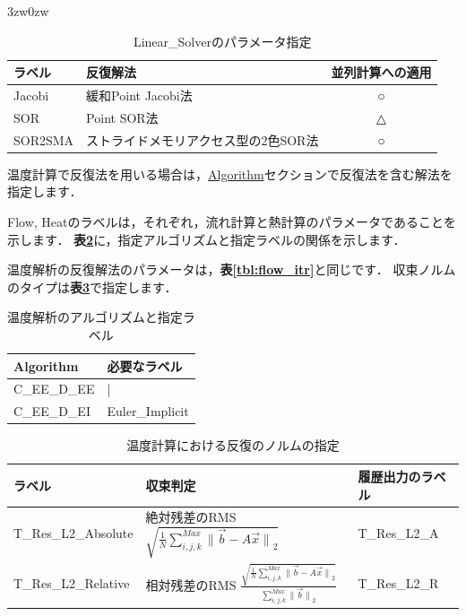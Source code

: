 \begin{indentation}{3zw}{0zw}
\begin{table}[htdp]
\caption{Linear\_Solverのパラメータ指定}
\begin{center}
\small
\begin{tabular}{llc} \toprule
ラベル & 反復解法 & 並列計算への適用\\ \midrule
Jacobi & 緩和Point Jacobi法 & ○\\
SOR & Point SOR法 & △\\
SOR2SMA & ストライドメモリアクセス型の2色SOR法 & ○\\ \bottomrule
\end{tabular}
\end{center}
\label{tbl:LS}
\end{table}


温度計算で反復法を用いる場合は，\hyperlink{tgt:algorithm}{Algorithm}セクションで反復法を含む解法を指定します．

Flow, Heatのラベルは，それぞれ，流れ計算と熱計算のパラメータであることを示します．
\textbf{表\ref{tbl:itr_temp_algo}}に，指定アルゴリズムと指定ラベルの関係を示します．

温度解析の反復解法のパラメータは，\textbf{表\ref{tbl:flow_itr}}と同じです．
収束ノルムのタイプは\textbf{表\ref{tbl:norm-type4temp}}で指定します．

\begin{table}[htdp]
\caption{温度解析のアルゴリズムと指定ラベル}
\begin{center}
\small
\begin{tabular}{ll} \toprule
Algorithm &  必要なラベル\\ \midrule
C\_EE\_D\_EE & | \\
C\_EE\_D\_EI & Euler\_Implicit\\ \bottomrule
\end{tabular}
\end{center}
\label{tbl:itr_temp_algo}
\end{table}

\begin{table}[htdp]
\caption{温度計算における反復のノルムの指定}
\begin{center}
\small
\begin{tabular}{lll} \toprule
ラベル & 収束判定 & 履歴出力のラベル\\ \midrule
\vspace{2mm}
T\_Res\_L2\_Absolute & 絶対残差のRMS $\displaystyle \sqrt{ \frac{1}{N} \sum_{i,j,k}^{Max} {\|\vec{b}- A \vec{x}\|}_{2} }$ & T\_Res\_L2\_A\\ 
T\_Res\_L2\_Relative & 相対残差のRMS $\displaystyle {\frac{ \sqrt{ \frac{1}{N} \sum_{i,j,k}^{Max}{\|\vec{b}- A \vec{x}\|}_{2}} } {\sum_{i,j,k}^{Max} {\|\vec{b}\|}_{2} }}$ & T\_Res\_L2\_R\\ \bottomrule
\end{tabular}
\end{center}
\label{tbl:norm-type4temp}
\end{table}

\end{indentation}



